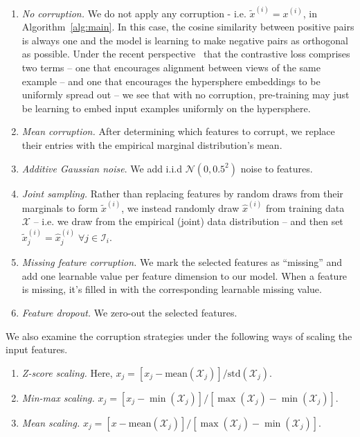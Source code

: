 \begin{enumerate}
\item \emph{No corruption.} We do not apply any corruption - i.e. $\tilde{x}^{(i)} = x^{(i)}$, in Algorithm~\ref{alg:main}. In this case, the cosine similarity between positive pairs is always one and the model is learning to make negative pairs as orthogonal as possible. Under the recent perspective~\citep{wang2020understanding} that the contrastive loss comprises two terms -- one that encourages alignment between views of the same example -- and one that encourages the hypersphere embeddings to be uniformly spread out -- we see that with no corruption, pre-training may just be learning to embed input examples uniformly on the hypersphere.
\item \emph{Mean corruption.} After determining which features to corrupt, we replace their entries with the empirical marginal distribution's mean.
\item \emph{Additive Gaussian noise}. We add i.i.d $\mathcal{N}(0, 0.5^2)$ noise to features.
\item \emph{Joint sampling.} Rather than replacing features by random draws from their marginals to form $\tilde{x}^{(i)}$, we instead randomly draw $\hat{x}^{(i)}$ from training data $\mathcal{X}$ -- i.e. we draw from the empirical (joint) data distribution -- and then set $\tilde{x}^{(i)}_j = \hat{x}_j^{(i)} \;\forall j \in \mathcal{I}_i$.
\item \emph{Missing feature corruption.} We mark the selected features as ``missing'' and add one learnable value per feature dimension to our model. When a feature is missing, it's filled in with the corresponding learnable missing value. 
\item \emph{Feature dropout.} We zero-out the selected features.
\end{enumerate}

We also examine the corruption strategies under the following ways of scaling the input features.

\begin{enumerate}
\item \emph{Z-score scaling.} Here, $x_j = \left[x_j-\mathrm{mean}\left({\mathcal{X}_j}\right)\right] / \mathrm{std}\left({\mathcal{X}_j}\right)$.
\item \emph{Min-max scaling.} $x_j = \left[x_j-\min\left({\mathcal{X}_j}\right)\right] / \left[\max\left({\mathcal{X}_j}\right)-\min\left({\mathcal{X}_j}\right)\right]$.
\item \emph{Mean scaling.} $x_j = \left[x-\mathrm{mean}\left({\mathcal{X}_j}\right)\right] / \left[\max\left({\mathcal{X}_j}\right)-\min\left({\mathcal{X}_j}\right)\right]$.
\end{enumerate}

